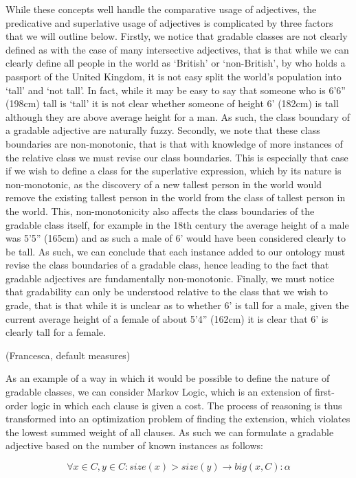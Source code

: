 \documentclass[11pt]{article}
\begin{document}
While these concepts well handle the comparative usage of adjectives, the predicative and superlative usage of adjectives is complicated by three factors that we will outline below. Firstly, we notice that gradable classes are not clearly defined as with the case of many intersective adjectives, that is that while we can clearly define all people in the world as `British' or `non-British', by who holds a passport of the United Kingdom, it is not easy split the world's population into `tall' and `not tall'. In fact, while it may be easy to say that someone who is 6'6'' (198cm) tall is `tall' it is not clear whether someone of height 6' (182cm) is tall although they are above average height for a man. As such, the class boundary of a gradable adjective are naturally fuzzy. Secondly, we note that these class boundaries are non-monotonic, that is that with knowledge of more instances of the relative class we must revise our class boundaries. This is especially that case if we wish to define a class for the superlative expression, which by its nature is non-monotonic, as the discovery of a new tallest person in the world would remove the existing tallest person in the world from the class of tallest person in the world. This, non-monotonicity also affects the class boundaries of the gradable class itself, for example in the 18th century the average height of a male was 5'5'' (165cm) and as such a male of 6' would have been considered clearly to be tall. As such, we can conclude that each instance added to our ontology must revise the class boundaries of a gradable class, hence leading to the fact that gradable adjectives are fundamentally non-monotonic. Finally, we must notice that gradability can only be understood relative to the class that we wish to grade, that is that while it is unclear as to whether 6' is tall for a male, given the current average height of a female of about 5'4'' (162cm) it is clear that 6' is clearly tall for a female.

(Francesca, default measures)

As an example of a way in which it would be possible to define the nature of gradable classes, we can consider Markov Logic\cite{?}, which is an extension of first-order logic in which each clause is given a cost. The process of reasoning is thus transformed into an optimization problem of finding the extension, which violates the lowest summed weight of all clauses. As such we can formulate a gradable adjective based on the number of known instances as follows:

$$\forall x \in C, y \in C : size(x) > size(y) \rightarrow big(x,C) : \alpha$$
\end{document}
